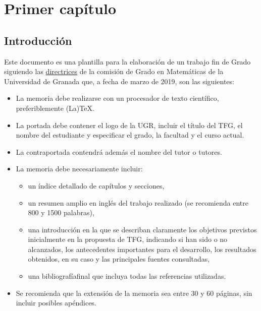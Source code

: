 
\chapter{Primer capítulo}\label{ch:primer-capitulo}

\section{Introducción}
Este documento es una plantilla para la elaboración de un trabajo fin de Grado siguiendo las \href{http://grados.ugr.es/matematicas/pages/infoacademica/tfg/fechaseinstruccionesdefensatfgcurso20172018/!}{directrices} de la comisión de Grado en Matemáticas de la Universidad de Granada que, a fecha de marzo de 2019, son las siguientes:

\begin{itemize}
  \item La  memoria  debe  realizarse  con  un  procesador  de  texto  científico,  preferiblemente (La)TeX.
  \item La portada  debe contener  el  logo  de  la UGR,  incluir  el  título del TFG, el nombre del estudiante y especificar el grado, la facultad y el curso actual.
  \item La contraportada contendrá además el nombre del tutor o tutores.
  \item La memoria debe necesariamente incluir:
    \begin{itemize}
      \item un índice detallado de capítulos y secciones,
      \item un resumen amplio en inglés del trabajo realizado (se recomienda entre 800 y 1500 palabras),
      \item una introducción en la que se describan claramente los objetivos previstos inicialmente en la propuesta de TFG, indicando si han sido o no alcanzados, los antecedentes importantes para el desarrollo, los resultados obtenidos, en su caso y las principales fuentes consultadas,
      \item una bibliografíafinal que incluya todas las referencias utilizadas.
    \end{itemize}
  \item Se recomienda que la extensión de la memoria sea entre 30 y 60 páginas, sin incluir posibles apéndices.
\end{itemize}

